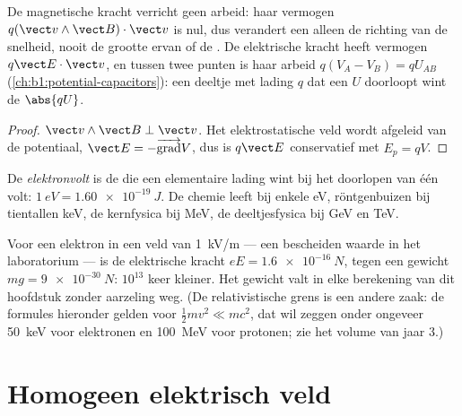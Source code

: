 \begin{proposition}\label{prop:b1:charged-particles:work}
De magnetische kracht verricht geen arbeid: haar vermogen $q(\vect v\wedge\vect B)\cdot\vect v$
is nul, dus verandert een  alleen de richting van de snelheid,
nooit de grootte ervan of de . De elektrische kracht heeft vermogen
$q\vect E\cdot\vect v$, en tussen twee punten is haar arbeid $q(V_A - V_B) =
qU_{AB}$ (\cref{ch:b1:potential-capacitors}): een deeltje met lading $q$
dat een  $U$ doorloopt wint de  $\abs{qU}$.
\end{proposition}

\begin{proof}
$\vect v\wedge\vect B \perp \vect v$. Het elektrostatische veld wordt afgeleid van
de potentiaal, $\vect E = -\overrightarrow{\operatorname{grad}}V$, dus is $q\vect E$
conservatief met $E_p = qV$.
\end{proof}

\begin{definition}[De elektronvolt]\label{def:b1:charged-particles:eV}
De \emph{elektronvolt} is de  die een elementaire lading
wint bij het doorlopen van één volt: $\qty{1}{eV} = \qty{1.60e-19}{J}$. De chemie
leeft bij enkele eV, röntgenbuizen bij tientallen keV, de kernfysica bij MeV,
de deeltjesfysica bij GeV en TeV.
\end{definition}

\begin{remark}\label{rem:b1:charged-particles:gravity}
Voor een elektron in een veld van \qty{1}{kV/m} --- een bescheiden waarde in
het laboratorium --- is de elektrische kracht $eE = \qty{1.6e-16}{N}$, tegen een gewicht
$mg = \qty{9e-30}{N}$: $10^{13}$ keer kleiner. Het gewicht valt in
elke berekening van dit hoofdstuk zonder aarzeling weg. (De
relativistische grens is een andere zaak: de formules hieronder gelden voor
$\tfrac12 mv^2 \ll mc^2$, dat wil zeggen onder ongeveer \qty{50}{keV} voor elektronen
en \qty{100}{MeV} voor protonen; zie het volume van jaar 3.)
\end{remark}

\section{Homogeen elektrisch veld}


